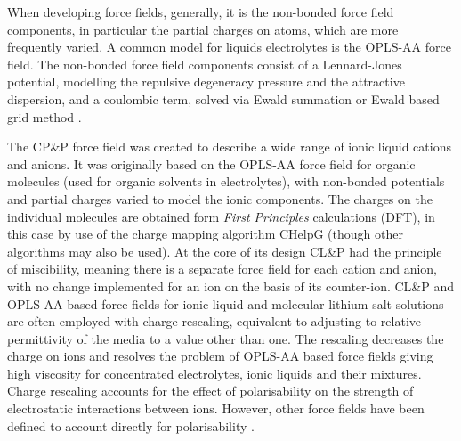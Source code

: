 \documentclass[../main.tex]{subfiles}
\begin{document}
When developing force fields, generally, it is the non-bonded force field components, in particular the partial charges on atoms, which are more frequently varied. A common model for liquids electrolytes is the OPLS-AA force field.\cite{jorgensen_development_1996} The non-bonded force field components consist of a Lennard-Jones potential, modelling the repulsive degeneracy pressure and the attractive dispersion, and a coulombic term, solved via Ewald summation \cite{ewald_berechnung_1921} or Ewald based grid method \cite{darden_particle_1993,deserno_how_1998,yeh_ewald_1999}.

The CP\&P force field \cite{canongia_lopes_clp_2012, canongia_lopes_modeling_2004, canongia_lopes_molecular_2004, canongia_lopes_molecular_2006} was created to describe a wide range of ionic liquid cations and anions. It was originally based on the OPLS-AA force field for organic molecules (used for organic solvents in electrolytes), with non-bonded potentials and partial charges varied to model the ionic components. The charges on the individual molecules are obtained form \textit{First Principles} calculations (DFT), in this case by use of the charge mapping algorithm CHelpG\cite{canongia_lopes_clp_2012} (though other algorithms may also be used\cite{spackman_potential_1996,breneman_determining_1990,singh_approach_1984}). At the core of its design CL\&P had the principle of miscibility, meaning there is a separate force field for each cation and anion, with no change implemented for an ion on the basis of its counter-ion. CL\&P and OPLS-AA based force fields for ionic liquid and molecular lithium salt solutions are often employed with charge rescaling, equivalent to adjusting to relative permittivity of the media to a value other than one. The rescaling decreases the charge on ions and resolves the problem of OPLS-AA based force fields giving high viscosity for concentrated electrolytes, ionic liquids and their mixtures\cite{schroder_comparing_2012, schroder_polarizable_2020, shimizu_structural_2015}. Charge rescaling accounts for the effect of polarisability on the strength of electrostatic interactions between ions. However, other force fields have been defined to account directly for polarisability \cite{schroder_polarizable_2020}.
\end{document}
